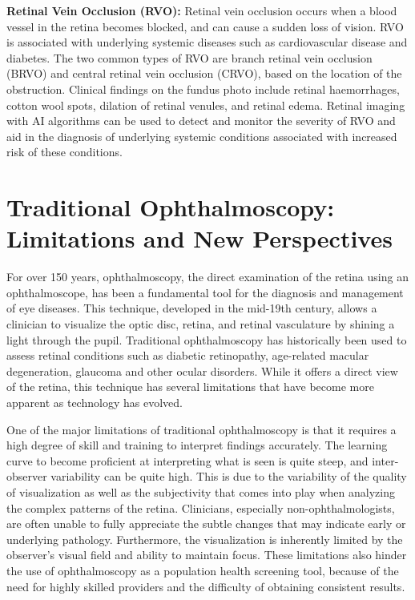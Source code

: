 \documentclass[
  Letterpaper,
]{scrbook}
\begin{document}
\textbf{Retinal Vein Occlusion (RVO):} Retinal vein occlusion occurs
when a blood vessel in the retina becomes blocked, and can cause a
sudden loss of vision. RVO is associated with underlying systemic
diseases such as cardiovascular disease and diabetes. The two common
types of RVO are branch retinal vein occlusion (BRVO) and central
retinal vein occlusion (CRVO), based on the location of the obstruction.
Clinical findings on the fundus photo include retinal haemorrhages,
cotton wool spots, dilation of retinal venules, and retinal edema.
Retinal imaging with AI algorithms can be used to detect and monitor the
severity of RVO and aid in the diagnosis of underlying systemic
conditions associated with increased risk of these conditions.

\section{Traditional Ophthalmoscopy: Limitations and New
Perspectives}\label{traditional-ophthalmoscopy-limitations-and-new-perspectives}

For over 150 years, ophthalmoscopy, the direct examination of the retina
using an ophthalmoscope, has been a fundamental tool for the diagnosis
and management of eye diseases. This technique, developed in the
mid-19th century, allows a clinician to visualize the optic disc,
retina, and retinal vasculature by shining a light through the pupil.
Traditional ophthalmoscopy has historically been used to assess retinal
conditions such as diabetic retinopathy, age-related macular
degeneration, glaucoma and other ocular disorders. While it offers a
direct view of the retina, this technique has several limitations that
have become more apparent as technology has evolved.

One of the major limitations of traditional ophthalmoscopy is that it
requires a high degree of skill and training to interpret findings
accurately. The learning curve to become proficient at interpreting what
is seen is quite steep, and inter-observer variability can be quite
high. This is due to the variability of the quality of visualization as
well as the subjectivity that comes into play when analyzing the complex
patterns of the retina. Clinicians, especially non-ophthalmologists, are
often unable to fully appreciate the subtle changes that may indicate
early or underlying pathology. Furthermore, the visualization is
inherently limited by the observer's visual field and ability to
maintain focus. These limitations also hinder the use of ophthalmoscopy
as a population health screening tool, because of the need for highly
skilled providers and the difficulty of obtaining consistent results.
\end{document}
